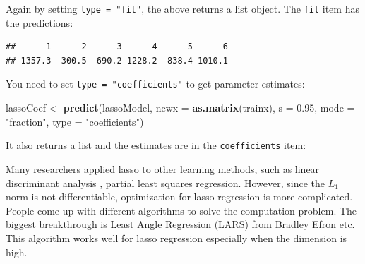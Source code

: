 \documentclass[12pt,]{krantz}
\makeatletter
\newenvironment{Shaded}{\begin{snugshade}}{\end{snugshade}}
\newcommand{\CommentTok}[1]{\textcolor[rgb]{0.37,0.37,0.37}{\textit{#1}}}
\newcommand{\DataTypeTok}[1]{\textcolor[rgb]{0.27,0.27,0.27}{#1}}
\newcommand{\FloatTok}[1]{\textcolor[rgb]{0.06,0.06,0.06}{#1}}
\newcommand{\KeywordTok}[1]{\textcolor[rgb]{0.27,0.27,0.27}{\textbf{#1}}}
\newcommand{\NormalTok}[1]{#1}
\newcommand{\OperatorTok}[1]{\textcolor[rgb]{0.43,0.43,0.43}{\textbf{#1}}}
\newcommand{\StringTok}[1]{\textcolor[rgb]{0.5,0.5,0.5}{#1}}
\newenvironment{kframe}{%
\medskip{}
\setlength{\fboxsep}{.8em}
 \def\at@end@of@kframe{}%
 \ifinner\ifhmode%
  \def\at@end@of@kframe{\end{minipage}}%
  \begin{minipage}{\columnwidth}%
 \fi\fi%
 \def\FrameCommand##1{\hskip\@totalleftmargin \hskip-\fboxsep
 \colorbox{shadecolor}{##1}\hskip-\fboxsep
     \hskip-\linewidth \hskip-\@totalleftmargin \hskip\columnwidth}%
 \MakeFramed {\advance\hsize-\width
   \@totalleftmargin\z@ \linewidth\hsize
   \@setminipage}}%
 {\par\unskip\endMakeFramed%
 \at@end@of@kframe}
\renewenvironment{Shaded}{\begin{kframe}}{\end{kframe}}
\makeatother
\begin{document}
Again by setting \texttt{type\ =\ "fit"}, the above returns a list object. The \texttt{fit} item has the predictions:

\begin{Shaded}
\end{Shaded}

\begin{verbatim}
##      1      2      3      4      5      6 
## 1357.3  300.5  690.2 1228.2  838.4 1010.1
\end{verbatim}

You need to set \texttt{type\ =\ "coefficients"} to get parameter estimates:

\begin{Shaded}
\begin{Highlighting}[]
\NormalTok{lassoCoef <-}\StringTok{ }\KeywordTok{predict}\NormalTok{(lassoModel, }
                     \DataTypeTok{newx =} \KeywordTok{as.matrix}\NormalTok{(trainx), }
                     \DataTypeTok{s =} \FloatTok{0.95}\NormalTok{, }
                     \DataTypeTok{mode =} \StringTok{"fraction"}\NormalTok{, }
                     \DataTypeTok{type =} \StringTok{"coefficients"}\NormalTok{)}
\end{Highlighting}
\end{Shaded}

It also returns a list and the estimates are in the \texttt{coefficients} item:

\begin{Shaded}
\end{Shaded}

Many researchers applied lasso to other learning methods, such as linear discriminant analysis \citep{Clem2011}, partial least squares regression\citep{chun2010}. However, since the \(L_1\) norm is not differentiable, optimization for lasso regression is more complicated. People come up with different algorithms to solve the computation problem. The biggest breakthrough is Least Angle Regression (LARS) from Bradley Efron etc. This algorithm works well for lasso regression especially when the dimension is high.
\end{document}
